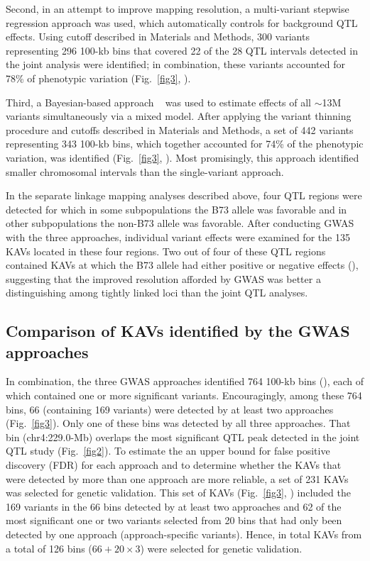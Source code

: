 \documentclass[10pt,letterpaper]{article}
\begin{document}
Second, in an attempt to improve mapping resolution, a multi-variant stepwise regression approach was used, which automatically controls for background QTL effects. Using cutoff described in Materials and Methods, 300 variants representing 296 100-kb bins that covered 22 of the 28 QTL intervals detected in the joint analysis were identified; in combination, these variants accounted for 78\% of phenotypic variation (Fig.~\ref{fig3}, ). 

Third, a Bayesian-based approach ~\cite{Habier2011} was used to estimate effects of all $\sim$13M variants simultaneously via a mixed model. After applying the variant thinning procedure and cutoffs described in Materials and Methods, a set of 442 variants representing 343 100-kb bins, which together accounted for 74\% of the phenotypic variation, was identified (Fig.~\ref{fig3}, ). Most promisingly, this approach identified smaller chromosomal intervals than the single-variant approach.

In the separate linkage mapping analyses described above, four QTL regions were detected for which in some subpopulations the B73 allele was favorable and in other subpopulations the non-B73 allele was favorable. After conducting GWAS with the three approaches, individual variant effects were examined for the 135 KAVs located in these four regions. Two out of four of these QTL regions contained KAVs at which the B73 allele had either positive or negative effects (), suggesting that the improved resolution afforded by GWAS was better a distinguishing among tightly linked loci than the joint QTL analyses. 

\subsection*{Comparison of KAVs identified by the GWAS approaches}
In combination, the three GWAS approaches identified 764 100-kb bins (), each of which contained one or more significant variants. Encouragingly, among these 764 bins, 66 (containing 169 variants) were detected by at least two approaches (Fig.~\ref{fig3}). Only one of these bins was detected by all three approaches. That bin (chr4:229.0-Mb) overlaps the most significant QTL peak detected in the joint QTL study (Fig.~\ref{fig2}). To estimate the an upper bound for false positive discovery (FDR) for each approach and to determine whether the KAVs that were detected by more than one approach are more reliable, a set of 231 KAVs was selected for genetic validation. This set of KAVs (Fig.~\ref{fig3}, ) included the 169 variants in the 66 bins detected by at least two approaches and 62 of the most significant one or two variants selected from 20 bins that had only been detected by one approach (approach-specific variants). Hence, in total KAVs from a total of 126 bins ($66 + 20 \times 3$) were selected for genetic validation.
\end{document}
